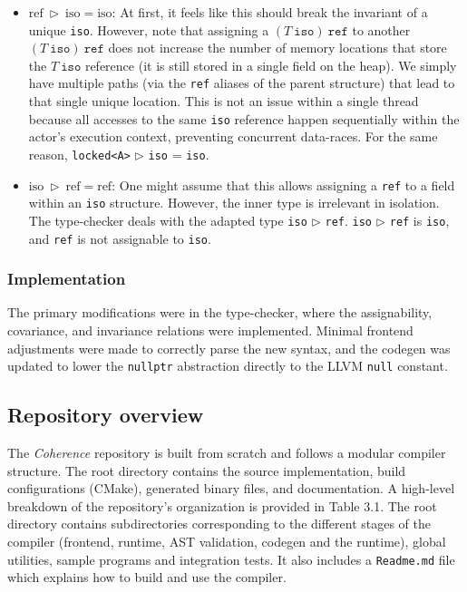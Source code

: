 \documentclass[a4paper,12pt,fleqn]{article}
\begin{document}
\begin{itemize}
  \item \textbf{$\text{ref}\ \triangleright\ \text{iso} = \text{iso}$}: At first, it feels like this should break the invariant of a unique \texttt{iso}. However, note that assigning a $(T \ \texttt{iso}) \ \texttt{ref}$ to another $(T \ \texttt{iso}) \ \texttt{ref}$ does not increase the number of memory locations that store the $T \ \texttt{iso}$ reference (it is still stored in a single field on the heap). We simply have multiple paths (via the \texttt{ref} aliases of the parent structure) that lead to that single unique location. This is not an issue within a single thread because all accesses to the same \texttt{iso} reference happen sequentially within the actor's execution context, preventing concurrent data-races. For the same reason, \texttt{locked<A>} $\triangleright$ \texttt{iso} = \texttt{iso}.
  \item \textbf{$\text{iso}\ \triangleright\ \text{ref} = \text{ref}$}: One might assume that this allows assigning a \texttt{ref} to a field within an \texttt{iso} structure. However, the inner type is irrelevant in isolation. The type-checker deals with the adapted type \texttt{iso} $\triangleright$ \texttt{ref}. \texttt{iso} $\triangleright$ \texttt{ref} is \texttt{iso}, and \texttt{ref} is not assignable to \texttt{iso}.
\end{itemize}

\subsubsection{Implementation}
The primary modifications were in the type-checker, where the assignability, covariance, and invariance relations were implemented. Minimal frontend adjustments were made to correctly parse the new syntax, and the codegen was updated to lower the \texttt{nullptr} abstraction directly to the LLVM \texttt{null} constant.

\subsection{Repository overview}
The \textit{Coherence} repository is built from scratch and follows a modular compiler structure. The root directory contains the source implementation, build configurations (CMake), generated binary files, and documentation. A high-level breakdown of the repository's organization is provided in Table 3.1. The root directory contains subdirectories corresponding to the different stages of the compiler (frontend, runtime, AST validation, codegen and the runtime), global utilities, sample programs and integration tests. It also includes a \texttt{Readme.md} file which explains how to build and use the compiler.
\end{document}
